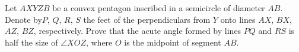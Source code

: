 Let $AXYZB$ be a convex pentagon inscribed in a semicircle of diameter $AB$. Denote by$P$,  $Q$,  $R$,  $S$ the feet of the perpendiculars from $Y$ onto lines $AX$,  $BX$,  $AZ$,  $BZ$,  respectively.  Prove that the acute angle formed by lines $PQ$ and $RS$ is half the size of $\angle XOZ$,  where $O$ is the midpoint of segment $AB$.